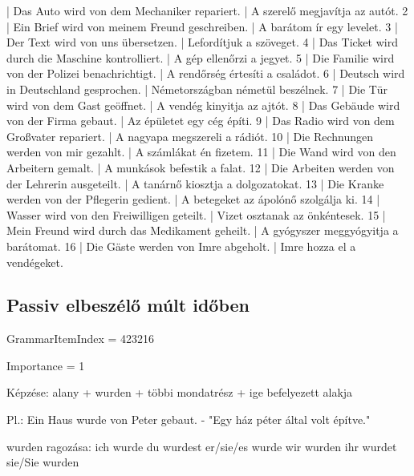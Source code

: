 \documentclass{article}
\newenvironment{desc}{\verbatim}{\endverbatim}
\newenvironment{exmp}{\verbatim}{\endverbatim}
\begin{document}
\begin{exmp}
1 | Das Auto wird von dem Mechaniker repariert. | A szerelő megjavítja az autót.
2 | Ein Brief wird von meinem Freund geschreiben. | A barátom ír egy levelet.
3 | Der Text wird von uns übersetzen. | Lefordítjuk a szöveget.
4 | Das Ticket wird durch die Maschine kontrolliert. | A gép ellenőrzi a jegyet.
5 | Die Familie wird von der Polizei benachrichtigt. | A rendőrség értesíti a családot.
6 | Deutsch wird in Deutschland gesprochen. | Németországban németül beszélnek.
7 | Die Tür wird von dem Gast geöffnet. | A vendég kinyitja az ajtót.
8 | Das Gebäude wird von der Firma gebaut. | Az épületet egy cég építi.
9 | Das Radio wird von dem Großvater repariert. | A nagyapa megszereli a rádiót.
10 | Die Rechnungen werden von mir gezahlt. | A számlákat én fizetem.
11 | Die Wand wird von den Arbeitern gemalt. | A munkások befestik a falat.
12 | Die Arbeiten werden von der Lehrerin ausgeteilt. | A tanárnő kiosztja a dolgozatokat.
13 | Die Kranke werden von der Pflegerin gedient. | A betegeket az ápolónő szolgálja ki.
14 | Wasser wird von den Freiwilligen geteilt. | Vizet osztanak az önkéntesek.
15 | Mein Freund wird durch das Medikament geheilt. | A gyógyszer meggyógyitja a barátomat.
16 | Die Gäste werden von Imre abgeholt. | Imre hozza el a vendégeket.
\end{exmp}

\subsection{Passiv elbeszélő múlt időben}

GrammarItemIndex = 423216

Importance = 1

\begin{desc}
Képzése: alany + wurden + többi mondatrész + ige befelyezett alakja

Pl.: Ein Haus wurde von Peter gebaut. - "Egy ház péter által volt építve."

wurden ragozása:
ich wurde
du wurdest
er/sie/es wurde
wir wurden
ihr wurdet
sie/Sie wurden
\end{desc}
\end{document}
